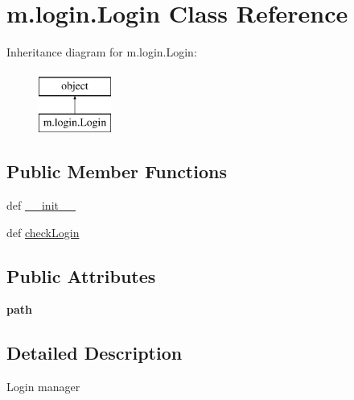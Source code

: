 \hypertarget{classm_1_1login_1_1_login}{\section{m.\-login.\-Login Class Reference}
\label{classm_1_1login_1_1_login}
}
Inheritance diagram for m.\-login.\-Login\-:\begin{figure}[H]
\begin{center}
\leavevmode
\includegraphics[height=2.000000cm]{classm_1_1login_1_1_login}
\end{center}
\end{figure}
\subsection*{Public Member Functions}
\begin{DoxyCompactItemize}
\item 
def \hyperlink{classm_1_1login_1_1_login_a6180bac74728dc060db2b8a192ad5426}{\-\_\-\-\_\-init\-\_\-\-\_\-}
\item 
def \hyperlink{classm_1_1login_1_1_login_ab5b1758239ba271d5e8ce570a1f99f44}{check\-Login}
\end{DoxyCompactItemize}
\subsection*{Public Attributes}
\begin{DoxyCompactItemize}
\item 
\hypertarget{classm_1_1login_1_1_login_ade5ae945e5a556dca5c38942d0d45ac3}{{\bfseries path}}\label{classm_1_1login_1_1_login_ade5ae945e5a556dca5c38942d0d45ac3}

\end{DoxyCompactItemize}


\subsection{Detailed Description}
\begin{DoxyVerb}Login manager
\end{DoxyVerb}
 

